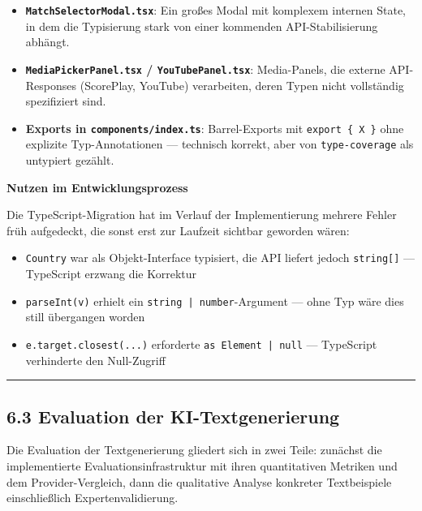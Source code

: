 \begin{itemize}
\tightlist
\item
  \textbf{\passthrough{\lstinline!MatchSelectorModal.tsx!}}: Ein großes
  Modal mit komplexem internen State, in dem die Typisierung stark von
  einer kommenden API-Stabilisierung abhängt.
\item
  \textbf{\passthrough{\lstinline!MediaPickerPanel.tsx!} /
  \passthrough{\lstinline!YouTubePanel.tsx!}}: Media-Panels, die externe
  API-Responses (ScorePlay, YouTube) verarbeiten, deren Typen nicht
  vollständig spezifiziert sind.
\item
  \textbf{Exports in \passthrough{\lstinline!components/index.ts!}}:
  Barrel-Exports mit \passthrough{\lstinline!export \{ X \}!} ohne
  explizite Typ-Annotationen --- technisch korrekt, aber von
  \passthrough{\lstinline!type-coverage!} als untypiert gezählt.
\end{itemize}

\textbf{Nutzen im Entwicklungsprozess}

Die TypeScript-Migration hat im Verlauf der Implementierung mehrere
Fehler früh aufgedeckt, die sonst erst zur Laufzeit sichtbar geworden
wären:

\begin{itemize}
\tightlist
\item
  \passthrough{\lstinline!Country!} war als Objekt-Interface typisiert,
  die API liefert jedoch \passthrough{\lstinline!string[]!} ---
  TypeScript erzwang die Korrektur
\item
  \passthrough{\lstinline!parseInt(v)!} erhielt ein
  \passthrough{\lstinline!string | number!}-Argument --- ohne Typ wäre
  dies still übergangen worden
\item
  \passthrough{\lstinline!e.target.closest(...)!} erforderte
  \passthrough{\lstinline!as Element | null!} --- TypeScript verhinderte
  den Null-Zugriff
\end{itemize}

\begin{center}\rule{0.5\linewidth}{0.5pt}\end{center}

\subsection{6.3 Evaluation der
KI-Textgenerierung}\label{evaluation-der-ki-textgenerierung}

Die Evaluation der Textgenerierung gliedert sich in zwei Teile: zunächst
die implementierte Evaluationsinfrastruktur mit ihren quantitativen
Metriken und dem Provider-Vergleich, dann die qualitative Analyse
konkreter Textbeispiele einschließlich Expertenvalidierung.

